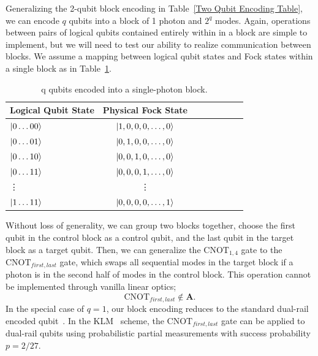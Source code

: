 \documentclass[aps,pra,twocolumn,showpacs,superscriptaddress,floatfix,10pt]{revtex4}
\begin{document}
Generalizing the 2-qubit block encoding in Table~\ref{Two Qubit Encoding Table}, we can encode $q$ qubits into a block of 1 photon and $2^q$ modes. Again, operations between pairs of logical qubits contained entirely within in a block are simple to implement, but we will need to test our ability to realize communication between blocks. We assume a  mapping between logical qubit states and Fock states within a single block as in Table~\ref{q Qubit Block Encoding}.
\begin {table}[h]
\begin{center}
	\begin{tabular}{l*{6}{c}r} 
		Logical Qubit State      \quad \quad \quad     & Physical Fock State \\
		\hline 
		\quad \quad \quad $\ket{0\dots00}$     & $\ket{1,0,0,0,\dots,0}$ \\
		\quad \quad \quad $\ket{0\dots01}$            & $\ket{0,1,0,0,\dots,0}$ \\
		\quad \quad \quad $\ket{0\dots10}$            & $\ket{0,0,1,0,\dots,0}$ \\
		\quad \quad \quad $\ket{0\dots11}$            & $\ket{0,0,0,1,\dots,0}$ \\
		\quad \quad \quad \quad \enspace \vdots & \vdots \\
		\quad \quad \quad $\ket{1\dots11}$            & $\ket{0,0,0,0,\dots,1}$ \\
	\end{tabular}
	\caption{ \label{q Qubit Block Encoding} q qubits encoded into a single-photon block.}
\end{center}
\end{table}
Without loss of generality, we can group two blocks together, choose the first qubit in the control block as a control qubit, and the last qubit in the target block as a target qubit. Then, we can generalize the $\mbox{CNOT}_{1,4}$ gate to the $\mbox{CNOT}_{first,last}$ gate, which swaps all sequential modes in the target block if a photon is in the second half of modes in the control block. This operation cannot be implemented through vanilla linear optics;
\begin{equation}
\mbox{CNOT}_{first,last} \notin \textbf{A}.
\end{equation}
In the special case of $q=1$, our block encoding reduces to the standard dual-rail encoded qubit~\cite{Review Paper}. In the KLM~\cite{KLM,KLM2} scheme, the $\mbox{CNOT}_{first,last}$ gate can be applied to dual-rail qubits using probabilistic partial measurements with success probability $p=2/27$. 
\end{document}
